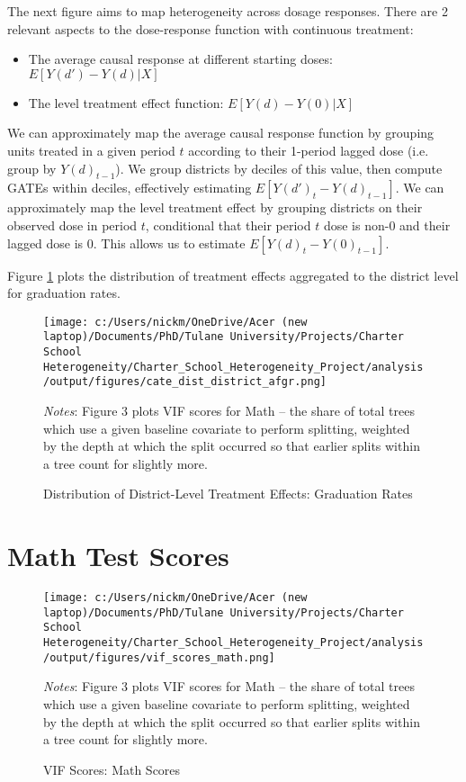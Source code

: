 \documentclass{article} %
\begin{document}
	The next figure aims to map heterogeneity across dosage responses. There are 2 relevant aspects to the dose-response function with continuous treatment:
\begin{itemize}
	\item The average causal response at different starting doses: $E[Y(d') - Y(d) | X]$
	\item The level treatment effect function: $E[Y(d) - Y(0) | X]$
\end{itemize}
	We can approximately map the average causal response function by grouping units treated in a given period $t$ according to their 1-period lagged dose (i.e. group by $Y(d)_{t-1}$). We group districts by deciles of this value, then compute GATEs within deciles, effectively estimating $E[Y(d')_t - Y(d)_{t-1}]$. We can approximately map the level treatment effect by grouping districts on their observed dose in period $t$, conditional that their period $t$ dose is non-0 and their lagged dose is 0. This allows us to estimate $E[Y(d)_t - Y(0)_{t-1}]$. 

Figure \ref{fig:treat_dist_district_afgr} plots the distribution of treatment effects aggregated to the district level for graduation rates.

\begin{figure}[!h]
\centering
\texttt{[image: c:/Users/nickm/OneDrive/Acer (new laptop)/Documents/PhD/Tulane University/Projects/Charter School Heterogeneity/Charter\_School\_Heterogeneity\_Project/analysis/output/figures/cate\_dist\_district\_afgr.png]}
\caption{Distribution of District-Level Treatment Effects: Graduation Rates}
\label{fig:treat_dist_district_afgr}
\begin{minipage}{1\linewidth}
\singlespacing
\footnotesize
\emph{Notes}: Figure 3 plots VIF scores for Math -- the share of total trees which use a given baseline covariate to perform splitting, weighted by the depth at which the split occurred so that earlier splits within a tree count for slightly more.  
\end{minipage}
\end{figure}


	\section{Math Test Scores}

\begin{figure}[H]
\centering
\texttt{[image: c:/Users/nickm/OneDrive/Acer (new laptop)/Documents/PhD/Tulane University/Projects/Charter School Heterogeneity/Charter\_School\_Heterogeneity\_Project/analysis/output/figures/vif\_scores\_math.png]}
\caption{VIF Scores: Math Scores}
\label{fig:image3}
\begin{minipage}{1\linewidth}
\singlespacing
\footnotesize
\emph{Notes}: Figure 3 plots VIF scores for Math -- the share of total trees which use a given baseline covariate to perform splitting, weighted by the depth at which the split occurred so that earlier splits within a tree count for slightly more.  
\end{minipage}
\end{figure}
\end{document}
